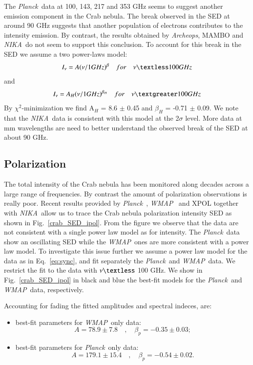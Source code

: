 \documentclass[twocolumn,traditabstract]{aa}
\def\NIKA{\textit{NIKA}}
\def\Planck{\textit{Planck}}
\def\WMAP{\textit{WMAP}}
\begin{document}
The \Planck\ data at 100, 143, 217 and 353 GHz seems to suggest another emission component in the Crab nebula. The break observed in the SED at around 90 GHz   suggests that another population of electrons contributes to the intensity emission. By contrast,  the results obtained by {\it Archeops}, MAMBO and \NIKA\ do not seem to support this conclusion. 
To account for this break in the SED we assume a two power-laws model:
\begin{equation}
I_{\nu} = A(\nu/1GHz)^{\beta} \quad for \quad \nu   \textless  100 GHz
\end{equation}
and 
\begin{equation}
I_{\nu} = A_{H}(\nu/1GHz)^{\beta_H} \quad for \quad \nu   \textgreater  100 GHz
\end{equation}
By $\chi^2$-minimization we find
A$_H$ = 8.6 $\pm$ 0.45 and $\beta_H$ = -0.71 $\pm$ 0.09.
We note that the \NIKA\ data is consistent with this model at the 2$\sigma$ level. More data at mm wavelengths are need to better understand the observed break of the SED at about 90 GHz. 


\subsection{Polarization}
The total intensity of the Crab nebula has been monitored along decades across a large range of frequencies. By contrast the amount of polarization observations is really poor.
Recent results provided by \Planck\ \citep{2015arXiv150702058P}, \WMAP\ \citep{2011ApJS..192...19W} and XPOL \citep{aumont2010} together with \NIKA\ allow us to trace the Crab nebula polarization intensity SED as shown in Fig.~\ref{crab_SED_ipol}. 
From the figure we observe that the data are not consistent with a single power law model as for intensity. 
The \Planck\ data show an oscillating SED while the \WMAP\ ones are more consistent with a power law model.
To investigate this issue further we assume a power law model for the data as in Eq.~\ref{eq:sync}, and fit separately the \Planck\ and \WMAP\ data.
We restrict the fit to the data with $\nu \textless$ 100 GHz. We show in Fig.~\ref{crab_SED_ipol} in black and blue the best-fit models for the \Planck\ and \WMAP\ data, respectively.

Accounting for fading the fitted amplitudes and spectral indeces, are:
\begin{itemize}
\item best-fit parameters for \WMAP\ only data:
\begin{equation}
A = 78.9\pm7.8 \quad , \quad \beta_p = -0.35\pm0.03;
\end{equation}
\item best-fit parameters for \Planck\ only data:
\begin{equation}
A = 179.1\pm15.4 \quad , \quad \beta_p = -0.54\pm0.02.
\end{equation}
\end{itemize}
\end{document}
